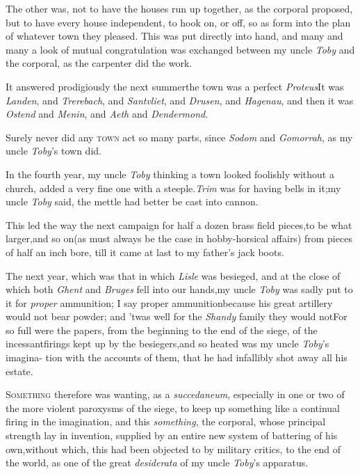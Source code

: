 \documentclass{article}
\begin{document}
The other was, not to have the houses run up together, as the
corporal propos\-ed, but to have every house independent, to hook on,
or off, so as form into the plan of whatever town they pleased.
This was put directly into hand, and many and many a look of mutual
congratulation was exchanged between my uncle \textit{Toby} and the
corporal, as the carpenter did the work.

\tsh It answered prodigiously the next
summer\tsh the town was a perfect
\textit{Proteus}\tsh It was \textit{Landen}, and
\textit{Trerebach}, and \textit{Santvliet}, and \textit{Drusen}, and
\textit{Hagenau},\break
\tsk and then it was \textit{Ostend} and
\textit{Menin}, and \textit{Aeth} and \textit{Dendermond}.\tsh

\tsh Surely never did any \textsc{town} act so
many parts, since \textit{Sodom} and \textit{Gomorrah}, as my uncle
\textit{Toby}’s town did.

In the fourth year, my uncle \textit{Toby} thinking a town looked
foolishly without a church, added a very fine one with a
steeple.\tsh \textit{Trim} was for having bells in
it;\tsh my uncle \textit{Toby} said, the\break
mettle had better be cast into cannon.

This led the way the next campaign for half a dozen brass
field pieces,\tsk to be 
what larger,\tsk and so
on\tsk (as must always be the case in hobby-horsical affairs)
from pieces of half an inch bore, till it came at last to my
father’s jack boots.

The next year, which was that in which \textit{Lisle} was
besieged, and at the close of which both \textit{Ghent} and
\textit{Bruges} fell into our hands,\tsk my uncle \textit{Toby} was
sadly put to it for \textit{proper} ammunition;\break
\tsh I say proper ammunition\tsh because his great artillery
would not bear powder; and ’twas well for the \textit{Shandy}
family they would not\tsh For so full were the papers, from the
beginning to the end of the siege, of the incessant\break firings kept
up by the besiegers,\tsh and so heated was my uncle
\textit{Toby}’s imagina- tion with the accounts of them, that he
had infallibly shot away all his estate.

\textsc{Something} therefore was wanting,\break
as a \textit{succedaneum}, especially in one or two of the more violent
paroxysms of the siege, to keep up something like a continual
firing in the imagination,\tsh\break
and this \textit{something}, the corporal, whose principal
strength lay in invention, supplied by an entire new system of
battering of his own,\tsk without which, this had been objected
to by military critics, to the end of the world, as one of the
great \textit{desiderata} of my uncle \textit{Toby}’s ap\-paratus.
\end{document}

